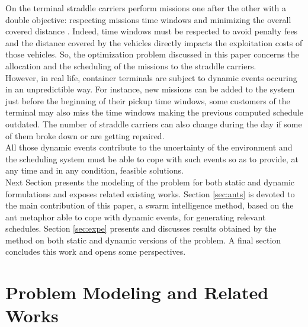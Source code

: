 \documentclass[a4paper,10pt]{article}
\begin{document}
On the terminal straddle carriers perform missions one after the other with a double objective: respecting missions time windows and minimizing the overall covered distance \cite{Lesauvage2009}. Indeed, time windows must be respected to avoid penalty fees and the distance covered by the vehicles directly impacts the exploitation costs of those vehicles. %
So, the optimization problem discussed in this paper concerns the allocation and the scheduling of the missions to the straddle carriers.\\

However, in real life, container terminals are subject to dynamic events occuring in an unpredictible way. For instance, new missions can be added to the system just before the beginning of their pickup time windows, some customers of the terminal may also miss the time windows making the previous computed schedule outdated. The number of straddle carriers can also change during the day if some of them broke down or are getting repaired.\\

All those dynamic events contribute to the uncertainty of the environment and the scheduling system must be able to cope with such events so as to provide, at any time and in any condition, feasible solutions.\\


Next Section presents the modeling of the problem for both static and dynamic formulations and exposes related existing works. Section \ref{sec:ants} is devoted to the main contribution of this paper, a swarm intelligence method, based on the ant metaphor able to cope with dynamic events, for generating relevant schedules. Section \ref{sec:expe} presents and discusses results obtained by the method on both static and dynamic versions of the problem. A final section concludes this work and opens some perspectives.


\section{Problem Modeling and Related Works}
\end{document}
